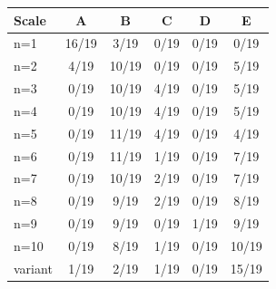 \begin{tabular}{lccccc}
\toprule
Scale & \cellcolor[HTML]{FFFFFF} A & \cellcolor[HTML]{D55E00} B & \cellcolor[HTML]{E69F00} C & \cellcolor[HTML]{009E73} D & \cellcolor[HTML]{56B4E9} E \\
\midrule
n=1 & \cellcolor[HTML]{FFFFFF} 16/19 & \cellcolor[HTML]{D55E00} 3/19 & \cellcolor[HTML]{E69F00} 0/19 & \cellcolor[HTML]{009E73} 0/19 & \cellcolor[HTML]{56B4E9} 0/19 \\
n=2 & \cellcolor[HTML]{FFFFFF} 4/19 & \cellcolor[HTML]{D55E00} 10/19 & \cellcolor[HTML]{E69F00} 0/19 & \cellcolor[HTML]{009E73} 0/19 & \cellcolor[HTML]{56B4E9} 5/19 \\
n=3 & \cellcolor[HTML]{FFFFFF} 0/19 & \cellcolor[HTML]{D55E00} 10/19 & \cellcolor[HTML]{E69F00} 4/19 & \cellcolor[HTML]{009E73} 0/19 & \cellcolor[HTML]{56B4E9} 5/19 \\
n=4 & \cellcolor[HTML]{FFFFFF} 0/19 & \cellcolor[HTML]{D55E00} 10/19 & \cellcolor[HTML]{E69F00} 4/19 & \cellcolor[HTML]{009E73} 0/19 & \cellcolor[HTML]{56B4E9} 5/19 \\
n=5 & \cellcolor[HTML]{FFFFFF} 0/19 & \cellcolor[HTML]{D55E00} 11/19 & \cellcolor[HTML]{E69F00} 4/19 & \cellcolor[HTML]{009E73} 0/19 & \cellcolor[HTML]{56B4E9} 4/19 \\
n=6 & \cellcolor[HTML]{FFFFFF} 0/19 & \cellcolor[HTML]{D55E00} 11/19 & \cellcolor[HTML]{E69F00} 1/19 & \cellcolor[HTML]{009E73} 0/19 & \cellcolor[HTML]{56B4E9} 7/19 \\
n=7 & \cellcolor[HTML]{FFFFFF} 0/19 & \cellcolor[HTML]{D55E00} 10/19 & \cellcolor[HTML]{E69F00} 2/19 & \cellcolor[HTML]{009E73} 0/19 & \cellcolor[HTML]{56B4E9} 7/19 \\
n=8 & \cellcolor[HTML]{FFFFFF} 0/19 & \cellcolor[HTML]{D55E00} 9/19 & \cellcolor[HTML]{E69F00} 2/19 & \cellcolor[HTML]{009E73} 0/19 & \cellcolor[HTML]{56B4E9} 8/19 \\
n=9 & \cellcolor[HTML]{FFFFFF} 0/19 & \cellcolor[HTML]{D55E00} 9/19 & \cellcolor[HTML]{E69F00} 0/19 & \cellcolor[HTML]{009E73} 1/19 & \cellcolor[HTML]{56B4E9} 9/19 \\
n=10 & \cellcolor[HTML]{FFFFFF} 0/19 & \cellcolor[HTML]{D55E00} 8/19 & \cellcolor[HTML]{E69F00} 1/19 & \cellcolor[HTML]{009E73} 0/19 & \cellcolor[HTML]{56B4E9} 10/19 \\
variant & \cellcolor[HTML]{FFFFFF} 1/19 & \cellcolor[HTML]{D55E00} 2/19 & \cellcolor[HTML]{E69F00} 1/19 & \cellcolor[HTML]{009E73} 0/19 & \cellcolor[HTML]{56B4E9} 15/19 \\
\bottomrule
\end{tabular}
